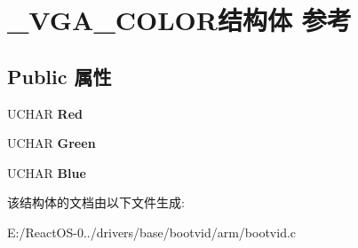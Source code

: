 \hypertarget{struct___v_g_a___c_o_l_o_r}{}\section{\+\_\+\+V\+G\+A\+\_\+\+C\+O\+L\+O\+R结构体 参考}
\label{struct___v_g_a___c_o_l_o_r}
\subsection*{Public 属性}
\begin{DoxyCompactItemize}
\item 
\mbox{\label{struct___v_g_a___c_o_l_o_r_a71e268759546615a5318cdb7aa0b2684}} 
U\+C\+H\+AR {\bfseries Red}
\item 
\mbox{\label{struct___v_g_a___c_o_l_o_r_a9b43dfd9c16f46ea6f36d0af1dc229d6}} 
U\+C\+H\+AR {\bfseries Green}
\item 
\mbox{\label{struct___v_g_a___c_o_l_o_r_a374c7bd9503db82d3d4d532646ccf59d}} 
U\+C\+H\+AR {\bfseries Blue}
\end{DoxyCompactItemize}


该结构体的文档由以下文件生成\+:\begin{DoxyCompactItemize}
\item 
E\+:/\+React\+O\+S-\/0../drivers/base/bootvid/arm/bootvid.\+c\end{DoxyCompactItemize}
